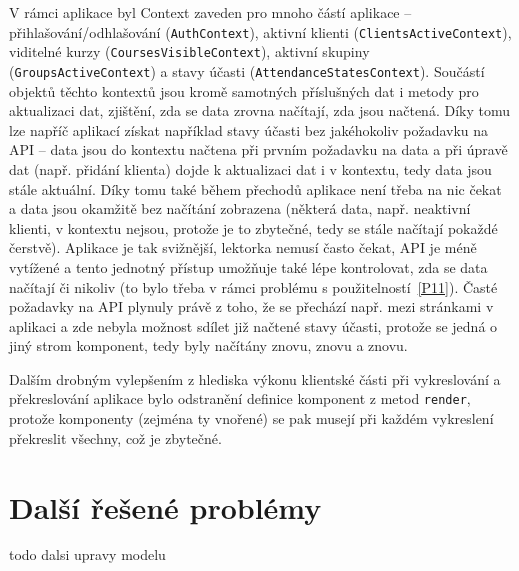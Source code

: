 V rámci aplikace byl Context zaveden pro mnoho částí aplikace -- přihlašování/odhlašování (\verb|AuthContext|), aktivní klienti (\verb|ClientsActiveContext|), viditelné kurzy (\verb|CoursesVisibleContext|), aktivní skupiny (\verb|GroupsActiveContext|) a stavy účasti (\verb|AttendanceStatesContext|). Součástí objektů těchto kontextů jsou kromě samotných příslušných dat i metody pro aktualizaci dat, zjištění, zda se data zrovna načítají, zda jsou načtená. Díky tomu lze napříč aplikací získat například stavy účasti bez jakéhokoliv požadavku na API -- data jsou do kontextu načtena při prvním požadavku na data a při úpravě dat (např. přidání klienta) dojde k aktualizaci dat i v kontextu, tedy data jsou stále aktuální. Díky tomu také během přechodů aplikace není třeba na nic čekat a data jsou okamžitě bez načítání zobrazena (některá data, např. neaktivní klienti, v kontextu nejsou, protože je to zbytečné, tedy se stále načítají pokaždé čerstvě). Aplikace je tak svižnější, lektorka nemusí často čekat, API je méně vytížené a tento jednotný přístup umožňuje také lépe kontrolovat, zda se data načítají či nikoliv (to bylo třeba v rámci problému s použitelností~\ref{P11}). Časté požadavky na API plynuly právě z toho, že se přechází např. mezi stránkami v aplikaci a zde nebyla možnost sdílet již načtené stavy účasti, protože se jedná o jiný strom komponent, tedy byly načítány znovu, znovu a znovu.

Dalším drobným vylepšením z hlediska výkonu klientské části při vykreslování a překreslování aplikace bylo odstranění definice komponent z metod \verb|render|, protože komponenty (zejména ty vnořené) se pak musejí při každém vykreslení překreslit všechny, což je zbytečné.

\section{Další řešené problémy}

todo dalsi upravy modelu

